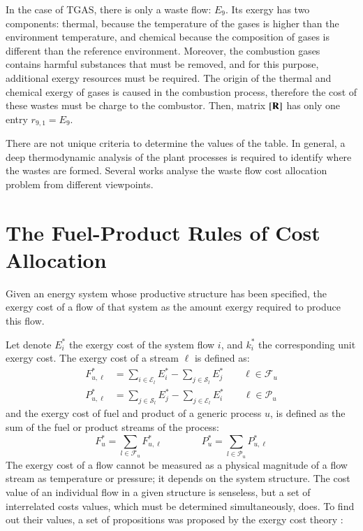 \documentclass{ecos}
\begin{document}
In the case of TGAS, there is only a waste flow: $E_9$. Its exergy has two components: thermal, because the  temperature of the gases is higher than the environment temperature, and chemical because the composition of gases is different than the reference environment. Moreover, the combustion gases contains harmful substances that must be removed, and for this purpose, additional exergy resources must be required. The origin of the thermal and chemical exergy of gases is caused in the combustion process, therefore the cost of these wastes must be charge to the combustor. Then, matrix $\left[ \textbf{R} \right]$ has only one entry $r_{9,1}=E_9$.

There are not unique criteria to determine the values of the  table. In general, a deep thermodynamic analysis of the plant processes is required to identify where the wastes are formed. Several works \cite{Frangopoulos87,Gonzalez03,Mendes17} analyse the waste flow cost allocation problem from different viewpoints.

\section{The Fuel-Product Rules of Cost Allocation}
Given an energy system whose productive structure has been specified, the exergy cost of a flow of that system as the amount exergy required to produce this flow.

Let denote $E_i^*$ the exergy cost of the system flow $i$, and $k_i^*$ the corresponding unit exergy cost. The exergy cost of a stream $\ell$ is defined as:
\begin{align}
F_{u,\ell}^{*}&=\sum_{i\in\mathcal{E}_l}{E_i^*}-\sum_{j\in\mathcal{S}_l}{E_j^*} \qquad \ell\in\mathcal{F}_u \\
P_{u,\ell}^{*}&=\sum_{j\in\mathcal{S}_l}{E_j^*}-\sum_{j\in\mathcal{E}_l}{E_i^*} \qquad \ell\in\mathcal{P}_u
\end{align}
and the exergy cost of fuel and product of a generic process $u$, is defined as the sum of the fuel or product streams of the process:
\begin{equation}
F_{u}^{*}=\sum_{l\in\mathcal{F}_u}{F_{u,\ell}^{*}} \qquad \qquad
P_{u}^{*}=\sum_{l\in\mathcal{P}_u}{P_{u,\ell}^{*}}
\end{equation}
The exergy cost of a flow cannot be measured as a physical magnitude of a flow stream as temperature or pressure; it depends on the system structure. The cost value of an individual flow in a given structure is senseless, but a set of interrelated costs values, which must be determined simultaneously, does. To find out their values, a set of propositions was proposed by the exergy cost theory \cite{Valero1986}:
\end{document}
